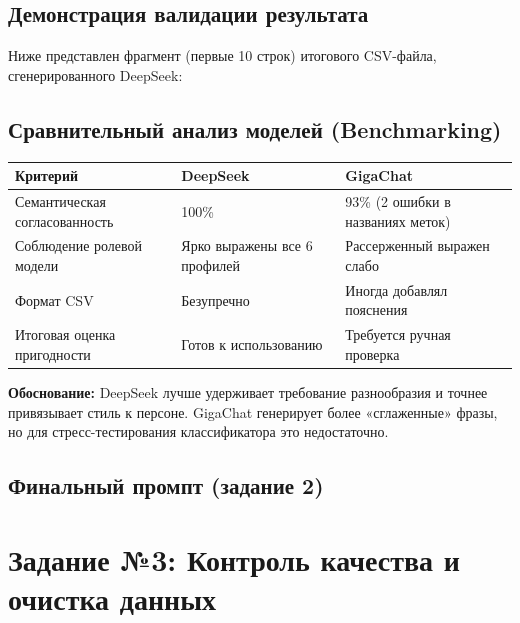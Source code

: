 \documentclass[oneside,a4paper,14pt]{extarticle} %
\begin{document}
\subsection{Демонстрация валидации результата}
\noindent
Ниже представлен фрагмент (первые 10 строк) итогового CSV-файла, сгенерированного DeepSeek:

\subsection{Сравнительный анализ моделей (Benchmarking)}
\noindent
\begin{table}[H]
\centering
\begin{tabular}{|p{6cm}|p{5cm}|p{5cm}|}
\hline
\textbf{Критерий} & \textbf{DeepSeek} & \textbf{GigaChat} \\ \hline
Семантическая согласованность & 100\% & 93\% (2 ошибки в названиях меток) \\ \hline
Соблюдение ролевой модели & Ярко выражены все 6 профилей & Рассерженный выражен слабо \\ \hline
Формат CSV & Безупречно & Иногда добавлял пояснения \\ \hline
Итоговая оценка пригодности & Готов к использованию & Требуется ручная проверка \\ \hline
\end{tabular}
\end{table}
\noindent
\textbf{Обоснование:} DeepSeek лучше удерживает требование разнообразия и точнее привязывает стиль к персоне. GigaChat генерирует более «сглаженные» фразы, но для стресс-тестирования классификатора это недостаточно.
\subsection{Финальный промпт (задание 2)}

\newpage
\section{Задание №3: Контроль качества и очистка данных}
\end{document}
